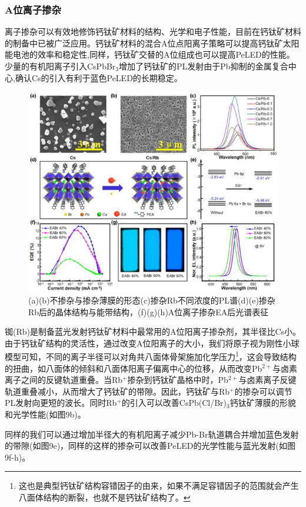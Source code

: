 \documentclass{phyasgn}\usepackage{nag}
\begin{document}
\subsubsection{A位离子掺杂}
\par 离子掺杂可以有效地修饰钙钛矿材料的结构、光学和电子性能，目前在钙钛矿材料的制备中已被广泛应用。钙钛矿材料的混合A位点阳离子策略可以提高钙钛矿太阳能电池的效率和稳定性,同样，钙钛矿交替的A位组成也可以提高PeLED的性能。少量的有机阳离子引入CsPbBr$_{3}$增加了钙钛矿的PL发射由于Pb抑制的金属复合中心,确认Cs的引入有利于蓝色PeLED的长期稳定。
	\begin{figure}[H]
		\centering
		\hspace{2em}\includegraphics[width=.8\linewidth]{pic/8.jpg}
		\caption{(a)(b)不掺杂与掺杂薄膜的形态(c)掺杂Rb不同浓度的PL谱(d)(e)掺杂Rb后的晶体结构与能带结构，(f)(g)(h)A位离子掺杂EA后光谱表征\cite{zhang2021blue}
		}
	\end{figure}
\par 铷(Rb)是制备蓝光发射钙钛矿材料中最常用的A位阳离子掺杂剂，其半径比Cs小。由于钙钛矿结构的灵活性，通过改变A位阳离子的大小，我们将原子视为刚性小球模型可知，不同的离子半径可以对角共八面体骨架施加化学压力\footnote{这也是典型钙钛矿结构容错因子的由来，如果不满足容错因子的范围就会产生八面体结构的断裂，也就不是钙钛矿结构了。}，这会导致结构的扭曲，如八面体的倾斜和八面体阳离子偏离中心的位移，从而改变Pb$^{2+}$与卤素离子之间的反键轨道重叠。当Rb$^+$掺杂到钙钛矿晶格中时，Pb$^{2+}$与卤素离子反键轨道重叠减小，从而增大了钙钛矿的带隙。因此，钙钛矿与Rb$^+$的掺杂可以调节PL发射向更短的波长。同时Rb$^+$的引入可以改善CsPb(Cl/Br)$_3$钙钛矿薄膜的形貌和光学性能(如图9b)。
\par 同样的我们可以通过增加半径大的有机阳离子减少Pb-Br轨道耦合并增加蓝色发射的带隙(如图9e)，同样的这样的掺杂可以改善PeLED的光学性能与蓝光发射(如图9f-h)。
\end{document}
